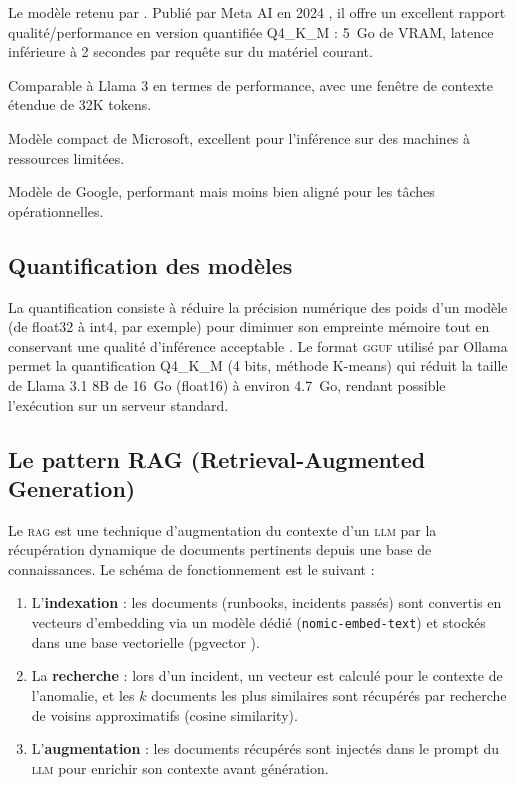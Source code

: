 \begin{description}[leftmargin=2cm]
  \item[Llama 3.1 8B] Le modèle retenu par \caimp{}. Publié par Meta AI en 2024
    \cite{llama3_meta2024}, il offre un excellent rapport qualité/performance en
    version quantifiée Q4\_K\_M : 5~Go de VRAM, latence inférieure à 2 secondes
    par requête sur du matériel courant.
  \item[Mistral 7B] Comparable à Llama 3 en termes de performance, avec une
    fenêtre de contexte étendue de 32K tokens.
  \item[Phi-3 Mini (3.8B)] Modèle compact de Microsoft, excellent pour l'inférence
    sur des machines à ressources limitées.
  \item[Gemma 7B] Modèle de Google, performant mais moins bien aligné pour les
    tâches opérationnelles.
\end{description}

\subsection{Quantification des modèles}

La quantification consiste à réduire la précision numérique des poids d'un modèle
(de float32 à int4, par exemple) pour diminuer son empreinte mémoire tout en
conservant une qualité d'inférence acceptable \cite{dettmers2022quantization}.
Le format \textsc{gguf} utilisé par Ollama permet la quantification
Q4\_K\_M (4 bits, méthode K-means) qui réduit la taille de Llama 3.1 8B de 16~Go
(float16) à environ 4.7~Go, rendant possible l'exécution sur un serveur standard.

\subsection{Le pattern RAG (Retrieval-Augmented Generation)}

Le \textsc{rag} \cite{lewis2020rag} est une technique d'augmentation du contexte
d'un \textsc{llm} par la récupération dynamique de documents pertinents depuis une
base de connaissances. Le schéma de fonctionnement est le suivant :

\begin{enumerate}
  \item L'\textbf{indexation} : les documents (runbooks, incidents passés) sont
    convertis en vecteurs d'embedding via un modèle dédié (\texttt{nomic-embed-text})
    et stockés dans une base vectorielle (pgvector \cite{pgvector2021}).
  \item La \textbf{recherche} : lors d'un incident, un vecteur est calculé pour
    le contexte de l'anomalie, et les $k$ documents les plus similaires sont
    récupérés par recherche de voisins approximatifs (cosine similarity).
  \item L'\textbf{augmentation} : les documents récupérés sont injectés dans le
    prompt du \textsc{llm} pour enrichir son contexte avant génération.
\end{enumerate}

